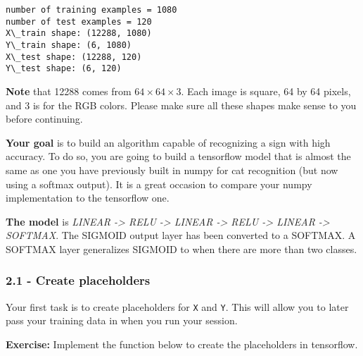 \documentclass[11pt]{article}
\begin{document}
    \begin{Verbatim}[commandchars=\\\{\}]
number of training examples = 1080
number of test examples = 120
X\_train shape: (12288, 1080)
Y\_train shape: (6, 1080)
X\_test shape: (12288, 120)
Y\_test shape: (6, 120)

    \end{Verbatim}

    \textbf{Note} that 12288 comes from \(64 \times 64 \times 3\). Each
image is square, 64 by 64 pixels, and 3 is for the RGB colors. Please
make sure all these shapes make sense to you before continuing.

    \textbf{Your goal} is to build an algorithm capable of recognizing a
sign with high accuracy. To do so, you are going to build a tensorflow
model that is almost the same as one you have previously built in numpy
for cat recognition (but now using a softmax output). It is a great
occasion to compare your numpy implementation to the tensorflow one.

\textbf{The model} is \emph{LINEAR -\textgreater{} RELU -\textgreater{}
LINEAR -\textgreater{} RELU -\textgreater{} LINEAR -\textgreater{}
SOFTMAX}. The SIGMOID output layer has been converted to a SOFTMAX. A
SOFTMAX layer generalizes SIGMOID to when there are more than two
classes.

    \subsubsection{2.1 - Create placeholders}\label{create-placeholders}

Your first task is to create placeholders for \texttt{X} and \texttt{Y}.
This will allow you to later pass your training data in when you run
your session.

\textbf{Exercise:} Implement the function below to create the
placeholders in tensorflow.
\end{document}
